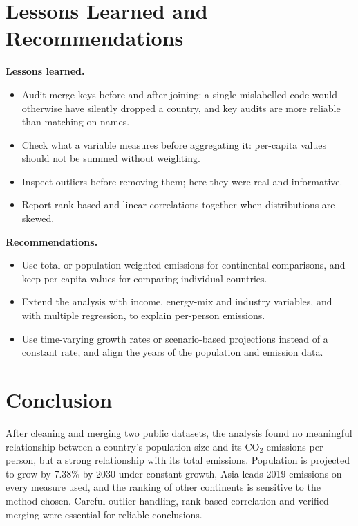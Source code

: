 \documentclass[11pt,a4paper]{article}
\begin{document}
	\section{Lessons Learned and Recommendations}
	\textbf{Lessons learned.}
	\begin{itemize}
		\item Audit merge keys before and after joining: a single mislabelled code would otherwise have silently dropped a country, and key audits are more reliable than matching on names.
		\item Check what a variable measures before aggregating it: per-capita values should not be summed without weighting.
		\item Inspect outliers before removing them; here they were real and informative.
		\item Report rank-based and linear correlations together when distributions are skewed.
	\end{itemize}
	\textbf{Recommendations.}
	\begin{itemize}
		\item Use total or population-weighted emissions for continental comparisons, and keep per-capita values for comparing individual countries.
		\item Extend the analysis with income, energy-mix and industry variables, and with multiple regression, to explain per-person emissions.
		\item Use time-varying growth rates or scenario-based projections instead of a constant rate, and align the years of the population and emission data.
	\end{itemize}
	
	\section{Conclusion}
	After cleaning and merging two public datasets, the analysis found no meaningful relationship between a country's population size and its CO$_2$ emissions per person, but a strong relationship with its total emissions. Population is projected to grow by 7.38\% by 2030 under constant growth, Asia leads 2019 emissions on every measure used, and the ranking of other continents is sensitive to the method chosen. Careful outlier handling, rank-based correlation and verified merging were essential for reliable conclusions.
	
\end{document}
